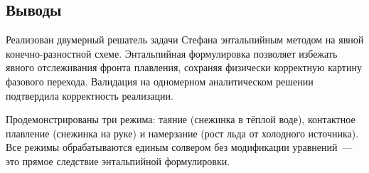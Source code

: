 \subsection{Выводы}

Реализован двумерный решатель задачи Стефана энтальпийным методом
на явной конечно-разностной схеме. Энтальпийная формулировка позволяет
избежать явного отслеживания фронта плавления, сохраняя физически
корректную картину фазового перехода. Валидация на одномерном
аналитическом решении подтвердила корректность реализации.

Продемонстрированы три режима: таяние (снежинка в тёплой воде),
контактное плавление (снежинка на руке) и намерзание (рост льда
от холодного источника). Все режимы обрабатываются единым солвером
без модификации уравнений~--- это прямое следствие энтальпийной
формулировки.